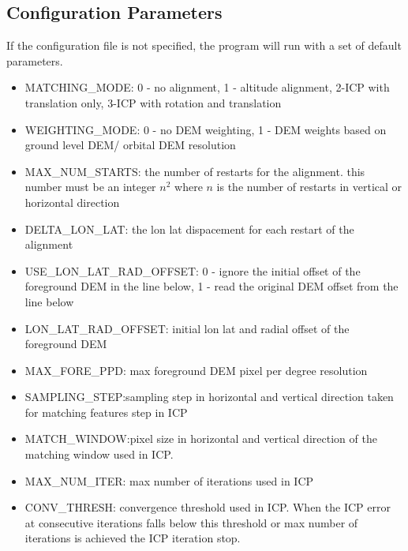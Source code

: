 \subsection{Configuration Parameters}
If the configuration file is not specified, the program will run with a set of default parameters.
\begin{itemize}

	\item{\textsc{MATCHING\_MODE}}: 0 - no alignment, 1 - altitude alignment, 2-ICP with translation only, 3-ICP with rotation and translation 
        \item{\textsc{WEIGHTING\_MODE}}: 0 - no DEM weighting, 1 - DEM weights based on ground level DEM/ orbital DEM resolution 
        \item{\textsc{MAX\_NUM\_STARTS}}: the number of restarts for the alignment. this number must be an integer $n^2$ where $n$ is the number of restarts in vertical or horizontal direction
        \item{\textsc{DELTA\_LON\_LAT}}: the lon lat dispacement for each restart of the alignment
        \item{\textsc{USE\_LON\_LAT\_RAD\_OFFSET}}: 0 - ignore the initial offset of the foreground DEM in the line below, 1 - read the original DEM offset from the line below 
        \item{\textsc{LON\_LAT\_RAD\_OFFSET}}: initial lon lat and radial offset of the foreground DEM
        \item{\textsc{MAX\_FORE\_PPD}}: max foreground DEM pixel per degree resolution
        \item{\textsc{SAMPLING\_STEP}}:sampling step in horizontal and vertical direction taken for matching features step in ICP
	\item{\textsc{MATCH\_WINDOW}}:pixel size in horizontal and vertical direction of the matching window used in ICP. 
        \item{\textsc{MAX\_NUM\_ITER}}: max number of iterations used in ICP
        \item{\textsc{CONV\_THRESH}}: convergence threshold used in ICP. When the ICP error at consecutive iterations falls below this threshold or max number of iterations is achieved the ICP iteration stop.

\end{itemize}
